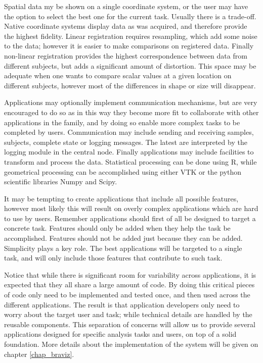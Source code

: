 Spatial data my be shown on a single coordinate system, or the user may have the option to select the best one for the current task. Usually there is a trade-off. Native coordinate systems display data as was acquired, and therefore provide the highest fidelity. Linear registration requires resampling, which add some noise to the data; however it is easier to make comparisons on registered data. Finally non-linear registration provides the highest correspondence between data from different subjects, but adds a significant amount of distortion. This space may be adequate when one wants to compare scalar values at a given location on different subjects, however most of the differences in shape or size will disappear.

Applications may optionally implement communication mechanisms, but are very encouraged to do so as in this way they become more fit to collaborate with other applications in the family, and by doing so enable more complex tasks to be completed by users. Communication may include sending and receiving samples, subjects, complete state or logging messages. The latest are interpreted by the logging module in the central node. Finally applications may include facilities to transform and process the data. Statistical processing can be done using R, while geometrical processing can be accomplished using either VTK or the python scientific libraries Numpy and Scipy. 

It may be tempting to create applications that include all possible features, however most likely this will result on overly complex applications which are hard to use by users. Remember applications should first of all be designed to target a concrete task. Features should only be added when they help the task be accomplished. Features should not be added just because they can be added. Simplicity plays a key role. The best applications will be targeted to a single task, and will only include those features that contribute to such task. 

Notice that while there is significant room for variability across applications, it is expected that they all share a large amount of code. By doing this critical pieces of code only need to be implemented and tested once, and then used across the different applications. The result is that application developers only need to worry about the target user and task; while technical details are handled by the reusable components. This separation of concerns will allow us to provide several applications designed for specific analysis tasks and users, on top of a solid foundation. More details about the implementation of the system will be given on chapter \ref{chap_braviz}.


